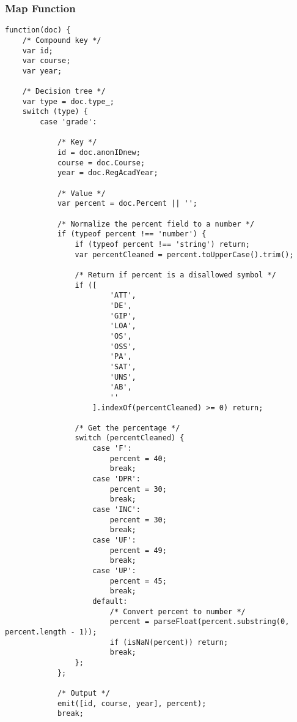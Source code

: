 \subsubsection{Map Function}
\label{2-way-join-map-function}
\begin{verbatim}
function(doc) {
    /* Compound key */
    var id;
    var course;
    var year;

    /* Decision tree */
    var type = doc.type_;
    switch (type) {
        case 'grade':

            /* Key */
            id = doc.anonIDnew;
            course = doc.Course;
            year = doc.RegAcadYear;

            /* Value */
            var percent = doc.Percent || '';

            /* Normalize the percent field to a number */
            if (typeof percent !== 'number') {
                if (typeof percent !== 'string') return;
                var percentCleaned = percent.toUpperCase().trim();

                /* Return if percent is a disallowed symbol */
                if ([
                        'ATT',
                        'DE',
                        'GIP',
                        'LOA',
                        'OS',
                        'OSS',
                        'PA',
                        'SAT',
                        'UNS',
                        'AB',
                        ''
                    ].indexOf(percentCleaned) >= 0) return;

                /* Get the percentage */
                switch (percentCleaned) {
                    case 'F':
                        percent = 40;
                        break;
                    case 'DPR':
                        percent = 30;
                        break;
                    case 'INC':
                        percent = 30;
                        break;
                    case 'UF':
                        percent = 49;
                        break;
                    case 'UP':
                        percent = 45;
                        break;
                    default:
                        /* Convert percent to number */
                        percent = parseFloat(percent.substring(0, percent.length - 1));
                        if (isNaN(percent)) return;
                        break;
                };
            };

            /* Output */
            emit([id, course, year], percent);
            break;


\end{verbatim}
